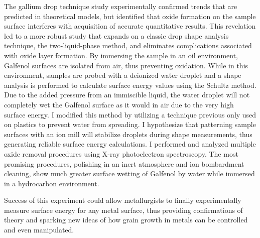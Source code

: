 The gallium drop technique study experimentally confirmed trends that are predicted in theoretical models, but identified that oxide formation on the sample surface interferes with acquisition of accurate quantitative results. This revelation led to a more robust study that expands on a classic drop shape analysis technique, the two-liquid-phase method, and eliminates complications associated with oxide layer formation. By immersing the sample in an oil environment, Galfenol surfaces are isolated from air, thus preventing oxidation. While in this environment, samples are probed with a deionized water droplet and a shape analysis is performed to calculate surface energy values using the Schultz method. Due to the added pressure from an immiscible liquid, the water droplet will not completely wet the Galfenol surface as it would in air due to the very high surface energy. I modified this method by utilizing a technique previous only used on plastics to prevent water from spreading. I hypothesize that patterning sample surfaces with an ion mill will stabilize droplets during shape measurements, thus generating reliable surface energy calculations. I performed and analyzed multiple oxide removal procedures using X-ray photoelectron spectroscopy. The most promising procedures, polishing in an inert atmosphere and ion bombardment cleaning, show much greater surface wetting of Galfenol by water while immersed in a hydrocarbon environment.

Success of this experiment could allow metallurgists to finally experimentally measure surface energy for any metal surface, thus providing confirmations of theory and sparking new ideas of how grain growth in metals can be controlled and even manipulated. 

